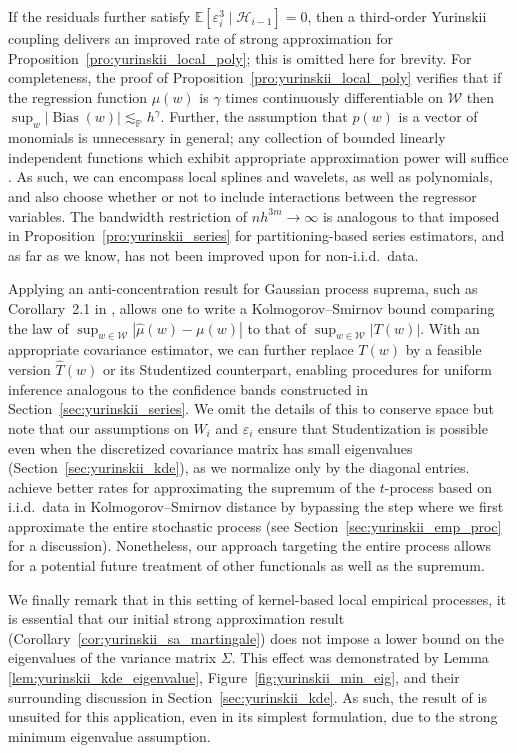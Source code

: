 \documentclass[11pt,lof]{puthesis}
\renewcommand{\P}{\ensuremath{\mathbb{P}}}
\newcommand{\E}{\ensuremath{\mathbb{E}}}
\newcommand{\cH}{\ensuremath{\mathcal{H}}}
\newcommand{\cW}{\ensuremath{\mathcal{W}}}
\DeclareMathOperator{\Bias}{Bias}
\theoremstyle{break}
\theoremstyle{proof}
\begin{document}
If the residuals further satisfy
$\E \left[ \varepsilon_i^3 \mid \cH_{i-1} \right] = 0$, then
a third-order Yurinskii coupling delivers an improved rate of strong
approximation for Proposition~\ref{pro:yurinskii_local_poly}; this is omitted
here for
brevity. For completeness, the proof of
Proposition~\ref{pro:yurinskii_local_poly}
verifies that if the regression function $\mu(w)$ is $\gamma$ times
continuously differentiable on $\cW$ then
$\sup_w |\Bias(w)| \lesssim_\P h^\gamma$. Further, the assumption that $p(w)$
is a vector of monomials is unnecessary in general; any collection of bounded
linearly independent functions which exhibit appropriate approximation power
will suffice \citep{eggermont2009maximum}. As such, we can encompass local
splines and wavelets, as well as polynomials, and also choose whether or not to
include interactions between the regressor variables. The bandwidth restriction
of $n h^{3m} \to \infty$ is analogous to that imposed in
Proposition~\ref{pro:yurinskii_series} for partitioning-based series
estimators, and as
far as we know, has not been improved upon for non-i.i.d.\ data.

Applying an anti-concentration result for Gaussian process suprema, such as
Corollary~2.1 in \citet{chernozhukov2014anti}, allows one to write a
Kolmogorov--Smirnov bound comparing the law of
$\sup_{w \in \cW}|\hat\mu(w) - \mu(w)|$ to that of $\sup_{w \in \cW}|T(w)|$.
With an appropriate covariance estimator, we can further replace $T(w)$ by a
feasible version $\hat T(w)$ or its Studentized counterpart, enabling
procedures for uniform inference analogous to the confidence bands constructed
in Section~\ref{sec:yurinskii_series}. We omit the details of this to conserve
space but
note that our assumptions on $W_i$ and $\varepsilon_i$ ensure that
Studentization is possible even when the discretized covariance matrix has
small eigenvalues (Section~\ref{sec:yurinskii_kde}), as we normalize only by
the diagonal
entries. \citet[Remark~3.1]{chernozhukov2014gaussian} achieve better rates for
approximating the supremum of the $t$-process based on i.i.d.\ data in
Kolmogorov--Smirnov distance by bypassing the step where we first approximate
the entire stochastic process (see Section~\ref{sec:yurinskii_emp_proc} for a
discussion).
Nonetheless, our approach targeting the entire process allows for a
potential future
treatment of other functionals as well as the supremum.

We finally remark that in this setting of kernel-based local empirical
processes, it is essential that our initial strong approximation result
(Corollary~\ref{cor:yurinskii_sa_martingale}) does not impose a lower bound on
the eigenvalues of the variance matrix $\Sigma$. This effect was demonstrated by
Lemma \ref{lem:yurinskii_kde_eigenvalue}, Figure~\ref{fig:yurinskii_min_eig},
and their surrounding discussion in Section~\ref{sec:yurinskii_kde}. As such,
the result of \citet{li2020uniform} is unsuited for this application, even in
its simplest formulation, due to the strong minimum eigenvalue assumption.
\end{document}
